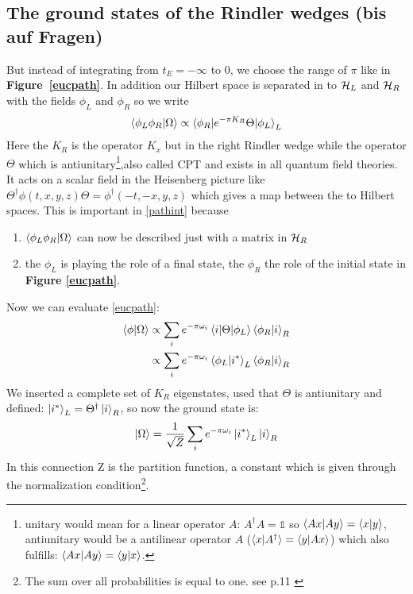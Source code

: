 \subsection{The ground states of the Rindler wedges \checkmark (bis auf Fragen)} \label{groundstate_rindler_wedges}
	But instead of integrating from $t_E= -\infty$ to 0, we choose the range of $\pi$ like in \textbf{Figure~\ref{eucpath}}. In addition our Hilbert space is separated in to $\mathcal{H}_L$ and $\mathcal{H}_R$ with the fields $\phi_L$ and $\phi_R$ so we write 
	\begin{align} \label{pathint}
		\braket{\phi_L \phi_R | \Omega} \propto \braket{\phi_R| e^{-\pi K_R} \Theta| \phi_L}_L
	\end{align}
	Here the $K_R$ is the operator $K_x$ but in the right Rindler wedge while the operator $\Theta$ which is antiunitary\footnote{unitary would mean for a linear operator $A$: $A^\dagger A = \mathds{1}$ so $\braket{Ax|Ay}=\braket{x|y}$, antiunitary would be a antilinear operator $A$ ($\braket{x|A^\dagger}=\braket{y|Ax}$) which also fulfills: $\braket{Ax|Ay}=\braket{y|x}$. },also called CPT and exists in all quantum field theories. It acts on a scalar field in the Heisenberg picture like $\Theta^\dagger \phi(t,x,y,z)\Theta = \phi^\dagger(-t,-x,y,z)$ which gives a map between the to Hilbert spaces. This is important in \eqref{pathint} because 
		\begin{enumerate}
			\item $\braket{\phi_L \phi_R| \Omega}$ can now be described just with a matrix in $\mathcal{H}_R$
			\item the $\phi_L$ is playing the role of a final state, the $\phi_R$ the role of the initial state in \textbf{Figure \ref{eucpath}}.
		\end{enumerate}
	Now we can evaluate \eqref{eucpath}:
	\begin{align}
		\braket{\phi|\Omega} &\propto \sum_i e^{-\pi \omega_i} \braket{i | \Theta | \phi_L} \braket{\phi_R|i}_R \nonumber\\
		&\propto \sum_i e^{-\pi \omega_i} \braket{\phi_L| i^*}_L\braket{\phi_R|i}_R
	\end{align} %
	We inserted a complete set of  $K_R$ eigenstates, used that $\Theta$ is antiunitary and defined: $\ket{i^*}_L = \Theta^\dagger \ket{i}_R$, so now the ground state is:
	\begin{align} \label{groundstate}
		\ket{\Omega} = \frac{1}{\sqrt{Z}} \sum_i  e^{-\pi \omega_i} \ket{i^*}_L \ket{i}_R 
	\end{align}
	In this connection Z is the partition function, a constant which is given through the normalization condition\footnote{The sum over all probabilities is equal to one. see p.11 \cite{Brenig}}. 
	
